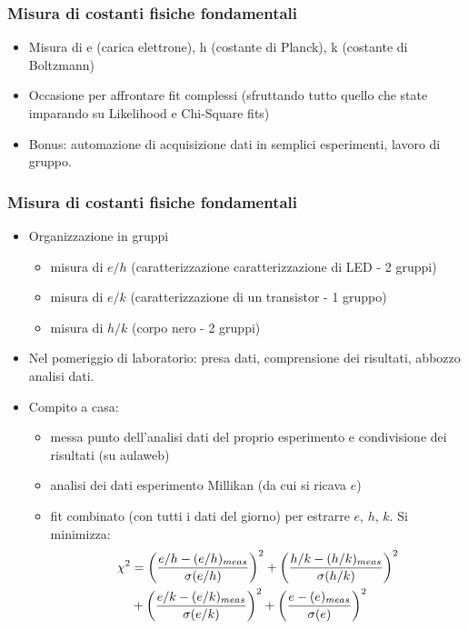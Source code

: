 


\frame
{
  \frametitle{Misura di costanti fisiche fondamentali}

  \begin{itemize}
    \item Misura di e (carica elettrone), h (costante di Planck), k (costante di Boltzmann)
    \item Occasione per affrontare fit complessi (sfruttando tutto quello che state imparando su Likelihood e Chi-Square fits)
    \item Bonus: automazione di acquisizione dati in semplici esperimenti, lavoro di gruppo.        
  \end{itemize}
}

\frame
{
  \frametitle{Misura di costanti fisiche fondamentali}

  \begin{itemize}
  \item Organizzazione in gruppi
    \begin{itemize}
    \item misura di $e/h$ (caratterizzazione caratterizzazione di LED - 2 gruppi)
    \item misura di $e/k$ (caratterizzazione di un transistor - 1 gruppo)
    \item misura di $h/k$ (corpo nero  - 2 gruppi)
    \end{itemize}
  \item Nel pomeriggio di laboratorio: presa dati, comprensione dei risultati, abbozzo analisi dati.
  \item Compito a casa:
    \begin{itemize}
      \item messa punto dell'analisi dati del proprio esperimento e condivisione dei risultati (su aulaweb)
      \item analisi dei dati esperimento Millikan (da cui si ricava $e$)
      \item fit combinato (con tutti i dati del giorno) per estrarre $e$, $h$, $k$. Si minimizza:
        {\footnotesize
    \begin{align*}
      \chi^2 &= {\left( e/h - (e/h)_{meas} \over \sigma(e/h) \right)^2} 
                + {\left( h/k - (h/k)_{meas} \over \sigma(h/k) \right)^2} \\
             &  + {\left( e/k - (e/k)_{meas} \over \sigma(e/k) \right)^2} 
                + {\left(e - (e)_{meas} \over \sigma(e)\right)^2}
    \end{align*}
    }
    \end{itemize}
  \end{itemize}
}

